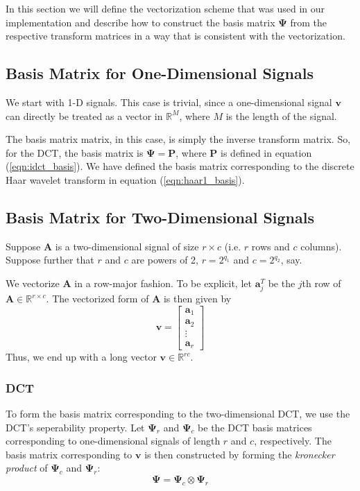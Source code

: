 In this section we will define the vectorization scheme that was used in our implementation and describe how to construct the basis matrix $\bm\Psi$ from the respective transform matrices in a way that is consistent with the vectorization.

\subsection{Basis Matrix for One-Dimensional Signals}
We start with 1-D signals. 
This case is trivial, since a one-dimensional signal $\bm v$ can directly be treated as a vector in $\mathbb{R}^M$, where $M$ is the length of the signal.

The basis matrix matrix, in this case, is simply the inverse transform matrix.
So, for the DCT, the basis matrix is $\bm\Psi = \bm P$, where $\bm P$ is defined in equation (\ref{eqn:idct_basis}).
We have defined the basis matrix corresponding to the discrete Haar wavelet transform in equation (\ref{eqn:haar1_basis}).

\subsection{Basis Matrix for Two-Dimensional Signals}
\label{sect:vectorize2d}
Suppose $\bm A$ is a two-dimensional signal of size $r\times c$ (i.e. $r$ rows and $c$ columns).
Suppose further that $r$ and $c$ are powers of 2, $r=2^{q_1}$ and $c = 2^{q_2}$, say.

We vectorize $\bm A$ in a row-major fashion.
To be explicit, let $\bm a_j^T$ be the $j$th row of $\bm A\in\mathbb{R}^{r\times c}$.
The vectorized form of $\bm A$ is then given by
\begin{equation*}
  \bm v = \begin{bmatrix}
    \bm a_1 \\
    \bm a_2 \\
    \vdots \\
    \bm a_r
  \end{bmatrix}
\end{equation*}
Thus, we end up with a long vector $\bm v \in \mathbb{R}^{rc}$.

\subsubsection{DCT}
To form the basis matrix corresponding to the two-dimensional DCT, we use the DCT's seperability property.
Let $\bm\Psi_r$ and $\bm\Psi_c$ be the DCT basis matrices corresponding to one-dimensional signals of length $r$ and $c$, respectively.
The basis matrix corresponding to $\bm v$ is then constructed by forming the \emph{kronecker product} of $\bm\Psi_c$ and $\bm\Psi_r$:
\begin{equation*}
\label{eqn:dct3_basis}
  \bm\Psi = \bm\Psi_c \otimes \bm\Psi_r
\end{equation*}

